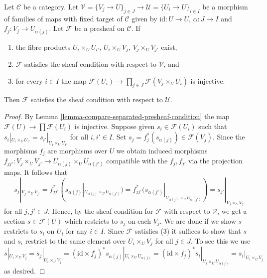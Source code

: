 \begin{lemma}
\label{lemma-compare-sheaf-condition}
Let $\mathcal{C}$ be a category. Let $\mathcal{V} = \{V_j \to U\}_{j \in J} \to
\mathcal{U} = \{U_i \to U\}_{i \in I}$ be a morphism of families of maps
with fixed target of $\mathcal{C}$ given by $\text{id} : U \to U$,
$\alpha : J \to I$ and $f_j : V_j \to U_{\alpha(j)}$. Let $\mathcal{F}$
be a presheaf on $\mathcal{C}$. If
\begin{enumerate}
\item the fibre products $U_i \times_U U_{i'}$, $U_i \times_U V_j$,
$V_j \times_U V_{j'}$ exist,
\item $\mathcal{F}$ satisfies the sheaf condition with respect to
$\mathcal{V}$, and
\item for every $i \in I$ the map
$\mathcal{F}(U_i) \to \prod_{j \in J} \mathcal{F}(V_j \times_U U_i)$
is injective.
\end{enumerate}
Then $\mathcal{F}$ satisfies the sheaf condition with respect to $\mathcal{U}$.
\end{lemma}

\begin{proof}
By Lemma \ref{lemma-compare-separated-presheaf-condition} the map
$\mathcal{F}(U) \to \prod \mathcal{F}(U_i)$ is injective.
Suppose given
$s_i \in \mathcal{F}(U_i)$ such that $s_i|_{U_i \times_U U_{i'}}
= s_{i'}|_{U_i \times_U U_{i'}}$ for all $i, i' \in I$.
Set $s_j = f_j^*(s_{\alpha(j)}) \in \mathcal{F}(V_j)$.
Since the morphisms $f_j$ are morphisms over $U$ we obtain
induced morphisms $f_{jj'} : V_j \times_U V_{j'} \to
U_{\alpha(j)} \times_U U_{\alpha(j')}$ compatible with the
$f_j, f_{j'}$ via the projection maps. It follows that
$$
s_j|_{V_j \times_U V_{j'}}
= f_{jj'}^*(s_{\alpha(j)}|_{U_{\alpha(j)} \times_U U_{\alpha(j')}})
= f_{jj'}^*(s_{\alpha(j')}|_{U_{\alpha(j)} \times_U U_{\alpha(j')}})
= s_{j'}|_{V_j \times_U V_{j'}}
$$
for all $j, j' \in J$. Hence, by the sheaf condition
for $\mathcal{F}$ with respect to $\mathcal{V}$, we get a section
$s \in \mathcal{F}(U)$ which restricts to $s_j$ on each $V_j$.
We are done if we show $s$ restricts to $s_i$ on $U_i$
for any $i \in I$. Since $\mathcal{F}$ satisfies (3) it
suffices to show that $s$ and $s_i$ restrict to the
same element over $U_i \times_U V_j$ for all $j \in J$.
To see this we use
$$
s|_{U_i \times_U V_j} = s_j|_{U_i \times_U V_j} =
(\text{id} \times f_j)^*s_{\alpha(j)}|_{U_i \times_U U_{\alpha(j)}} =
(\text{id} \times f_j)^*s_i|_{U_i \times_U U_{\alpha(j)}} =
s_i|_{U_i \times_U V_j}
$$
as desired.
\end{proof}

